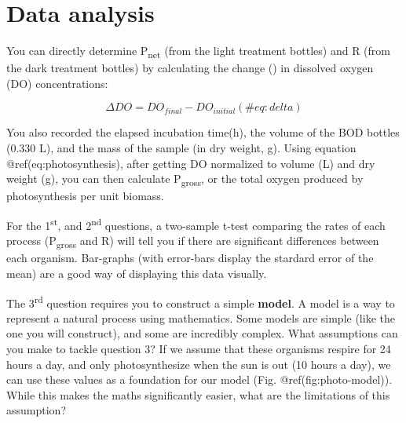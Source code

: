\documentclass[11pt,]{article}
\begin{document}
\hypertarget{data-analysis}{%
\section{Data analysis}\label{data-analysis}}

You can directly determine P\textsubscript{net} (from the light
treatment bottles) and R (from the dark treatment bottles) by
calculating the change (\textDelta) in dissolved oxygen (DO)
concentrations:

\begin{equation}
\Delta{}DO = DO_{final} - DO_{initial}
(\#eq:delta)
\end{equation}

You also recorded the elapsed incubation time(\textDelta{}h), the volume
of the BOD bottles (0.330 L), and the mass of the sample (in dry weight,
g). Using equation @ref(eq:photosynthesis), after getting \textDelta{}DO
normalized to volume (L) and dry weight (g), you can then calculate
P\textsubscript{gross}, or the total oxygen produced by photosynthesis
per unit biomass.

For the 1\textsuperscript{st}, and 2\textsuperscript{nd} questions, a
two-sample t-test comparing the rates of each process
(P\textsubscript{gross} and R) will tell you if there are significant
differences between each organism. Bar-graphs (with error-bars display
the stardard error of the mean) are a good way of displaying this data
visually.

The 3\textsuperscript{rd} question requires you to construct a simple
\textbf{model}. A model is a way to represent a natural process using
mathematics. Some models are simple (like the one you will construct),
and some are incredibly complex. What assumptions can you make to tackle
question 3? If we assume that these organisms respire for 24 hours a
day, and only photosynthesize when the sun is out (10 hours a day), we
can use these values as a foundation for our model (Fig.
@ref(fig:photo-model)). While this makes the maths significantly easier,
what are the limitations of this assumption?
\end{document}
